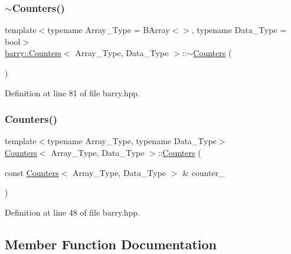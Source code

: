 \subsubsection{\texorpdfstring{$\sim$\+Counters()}{~Counters()}}
{\footnotesize\ttfamily template$<$typename Array\+\_\+\+Type = B\+Array$<$$>$, typename Data\+\_\+\+Type = bool$>$ \\
\hyperlink{classbarry_1_1_counters}{barry\+::\+Counters}$<$ Array\+\_\+\+Type, Data\+\_\+\+Type $>$\+::$\sim$\hyperlink{classbarry_1_1_counters}{Counters} (\begin{DoxyParamCaption}{ }\end{DoxyParamCaption})\hspace{0.3cm}{\ttfamily [inline]}}



Definition at line 81 of file barry.\+hpp.

\mbox{\label{classbarry_1_1_counters_a178c0267c1f52a36e10e9d257a21a224}} 
\subsubsection{\texorpdfstring{Counters()}{Counters()}\hspace{0.1cm}{\footnotesize\ttfamily [2/2]}}
{\footnotesize\ttfamily template$<$typename Array\+\_\+\+Type, typename Data\+\_\+\+Type$>$ \\
\hyperlink{classbarry_1_1_counters}{Counters}$<$ Array\+\_\+\+Type, Data\+\_\+\+Type $>$\+::\hyperlink{classbarry_1_1_counters}{Counters} (\begin{DoxyParamCaption}\item[{const \hyperlink{classbarry_1_1_counters}{Counters}$<$ Array\+\_\+\+Type, Data\+\_\+\+Type $>$ \&}]{counter\+\_\+ }\end{DoxyParamCaption})\hspace{0.3cm}{\ttfamily [inline]}}



Definition at line 48 of file barry.\+hpp.



\subsection{Member Function Documentation}
\mbox{\label{classbarry_1_1_counters_a5b5dafc7a3e0eedae400457f69937613}} 
